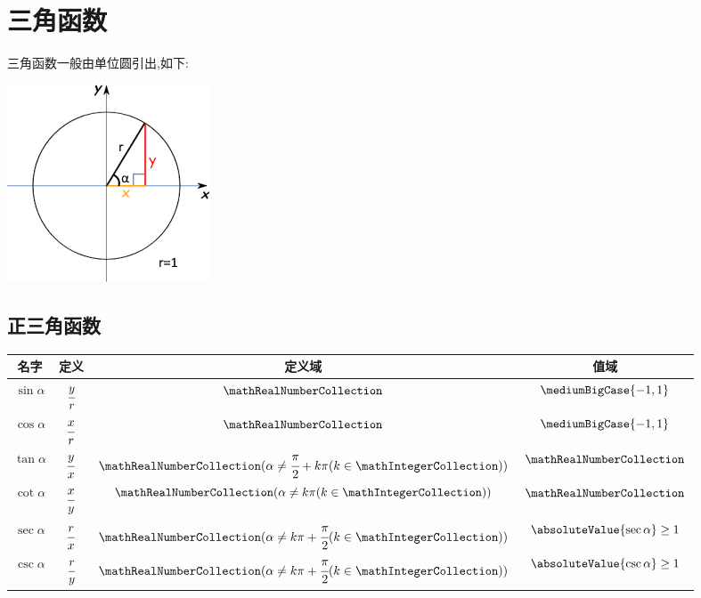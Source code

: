 \section{三角函数}{
三角函数一般由单位圆引出,如下:

\begin{center}
  \includegraphics{resources/UnitCircle.png}
\end{center}

\subsection{正三角函数}{
  \begin{tabular}{|c|c|c|c|}
    \hline
    名字           & 定义           & 定义域                                                                                       & 值域                                \\
    \hline
    $\sin{\alpha}$ & $\cfrac{y}{r}$ & $\mathRealNumberCollection$                                                                  & $\mediumBigCase{-1,1}$              \\
    \hline
    $\cos{\alpha}$ & $\cfrac{x}{r}$ & $\mathRealNumberCollection$                                                                  & $\mediumBigCase{-1,1}$              \\
    \hline
    $\tan{\alpha}$ & $\cfrac{y}{x}$ & $\mathRealNumberCollection(\alpha \neq \cfrac{\pi}{2} + k\pi(k \in \mathIntegerCollection))$ & $\mathRealNumberCollection$         \\
    \hline
    $\cot{\alpha}$ & $\cfrac{x}{y}$ & $\mathRealNumberCollection(\alpha \neq k\pi(k \in \mathIntegerCollection))$                  & $\mathRealNumberCollection$         \\
    \hline
    $\sec{\alpha}$ & $\cfrac{r}{x}$ & $\mathRealNumberCollection(\alpha \neq k\pi + \cfrac{\pi}{2}(k \in \mathIntegerCollection))$ & $\absoluteValue{\sec\alpha} \geq 1$ \\
    \hline
    $\csc{\alpha}$ & $\cfrac{r}{y}$ & $\mathRealNumberCollection(\alpha \neq k\pi + \cfrac{\pi}{2}(k \in \mathIntegerCollection))$ & $\absoluteValue{\csc\alpha} \geq 1$ \\
    \hline
  \end{tabular}
}%

}
